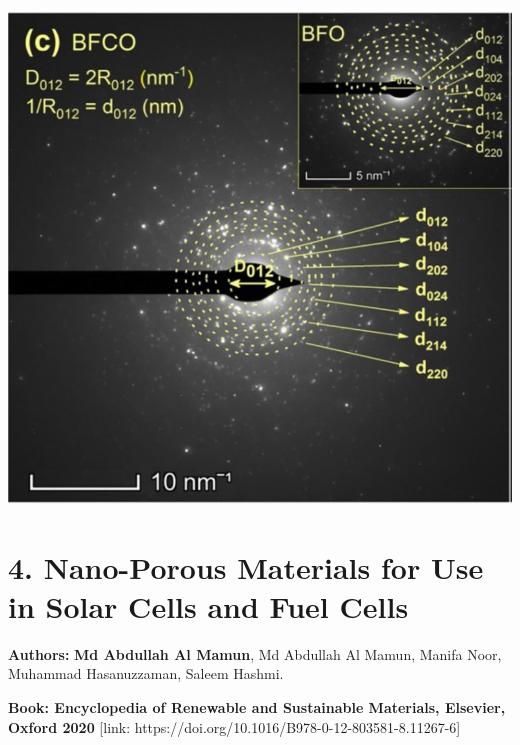 \documentclass[a4paper,20pt]{article}
\begin{document}
    \begin{minipage}{0.4\linewidth}\begin{flushright}
    	 	\includegraphics[width=0.85\linewidth]{jms}\\
    	 	
    	\end{flushright}\end{minipage}

\vspace{20pt}

\section{\textbf{4. Nano-Porous Materials for Use in Solar Cells and Fuel Cells}}

\textbf{Authors:} \textbf{Md Abdullah Al Mamun}, Md Abdullah Al Mamun, Manifa Noor, Muhammad Hasanuzzaman, Saleem Hashmi. \\ \vspace{3pt}

\textbf{Book: Encyclopedia of Renewable and Sustainable Materials, Elsevier, Oxford 2020} [link: https://doi.org/10.1016/B978-0-12-803581-8.11267-6] \\ \vspace{8pt}
\end{document}
